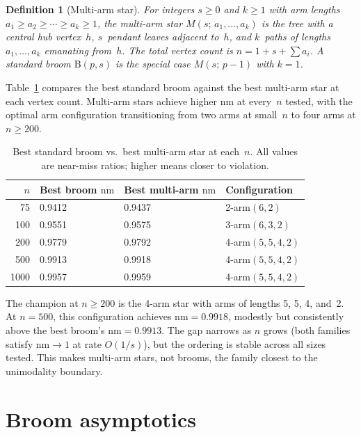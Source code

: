 \documentclass[12pt,oneside]{article}
\newtheorem{definition}{Definition}
\theoremstyle{remark}
\newcommand{\nm}{\mathrm{nm}}             %
\newcommand{\broom}{\mathrm{B}}           %
\begin{document}
\begin{definition}[Multi-arm star]
  For integers $s \ge 0$ and $k \ge 1$ with arm lengths $a_1 \ge a_2 \ge \cdots \ge a_k \ge 1$, the \emph{multi-arm star} $M(s;\, a_1, \dotsc, a_k)$ is the tree with a central hub vertex~$h$, $s$~pendant leaves adjacent to~$h$, and $k$~paths of lengths $a_1, \dotsc, a_k$ emanating from~$h$.  The total vertex count is $n = 1 + s + \sum a_i$.
  A standard broom $\broom(p,s)$ is the special case $M(s;\, p-1)$ with $k = 1$.
\end{definition}

Table~\ref{tab:multiarm} compares the best standard broom against the best multi-arm star at each vertex count.
Multi-arm stars achieve higher $\nm$ at every~$n$ tested, with the optimal arm configuration transitioning from two arms at small~$n$ to four arms at $n \ge 200$.
\begin{table}[ht]
  \centering
  \caption{Best standard broom vs.\ best multi-arm star at each~$n$.
    All values are near-miss ratios; higher means closer to violation.}
  \label{tab:multiarm}
  \begin{tabular}{r l l l}
    \toprule
    $n$ & Best broom $\nm$ & Best multi-arm $\nm$ & Configuration \\
    \midrule
    75   & 0.9412 & 0.9437 & 2-arm$(6,2)$ \\
    100  & 0.9551 & 0.9575 & 3-arm$(6,3,2)$ \\
    200  & 0.9779 & 0.9792 & 4-arm$(5,5,4,2)$ \\
    500  & 0.9913 & 0.9918 & 4-arm$(5,5,4,2)$ \\
    1000 & 0.9957 & 0.9959 & 4-arm$(5,5,4,2)$ \\
    \bottomrule
  \end{tabular}
\end{table}

The champion at $n \ge 200$ is the 4-arm star with arms of lengths 5, 5, 4, and~2.
At $n = 500$, this configuration achieves $\nm = 0.9918$, modestly but consistently above the best broom's $\nm = 0.9913$.
The gap narrows as $n$ grows (both families satisfy $\nm \to 1$ at rate $O(1/s)$), but the ordering is stable across all sizes tested.
This makes multi-arm stars, not brooms, the family closest to the unimodality boundary.


\section{Broom asymptotics}\label{sec:broom}
\end{document}
